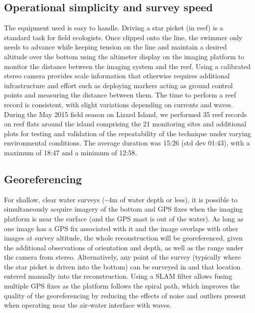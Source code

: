 \subsection{Operational simplicity and survey speed}
The equipment used is easy to handle. Driving a star picket (in reef) is a standard task for field ecologists. Once clipped onto the line, the swimmer only needs to advance while keeping tension on the line and maintain a desired altitude over the bottom using the altimeter display on the imaging platform to monitor the distance between the imaging system and the reef.  
Using a calibrated stereo camera provides scale information that otherwise requires additional infrastructure and effort such as deploying markers acting as ground control points and measuring the distance between them. 
The time to perform a reef record is consistent, with slight variations depending on currents and waves. During the May 2015 field season on Lizard Island, we performed 35 reef records on reef flats around the island comprising the 21 monitoring sites and additional plots for testing and validation of the repeatability of the technique under varying environmental conditions. The average duration was 15:26 (std dev 01:43), with a maximum of 18:47 and a minimum of 12:58. 





\subsection{Georeferencing}
For shallow, clear water surveys (\sim4m of water depth or less), it is possible to simultaneously acquire imagery of the bottom and GPS fixes when the imaging platform is near the surface (and the GPS mast is out of the water). As long as one image has a GPS fix associated with it and the image overlaps with other images at survey altitude, the whole reconstruction will be georeferenced, given the additional observations of orientation and depth, as well as the range under the camera from stereo. Alternatively, any point of the survey (typically where the star picket is driven into the bottom) can be surveyed in and that location entered manually into the reconstruction. Using a SLAM filter allows fusing multiple GPS fixes as the platform follows the spiral path, which improves the quality of the georeferencing by reducing the effects of noise and outliers present when operating near the air-water interface with waves.

